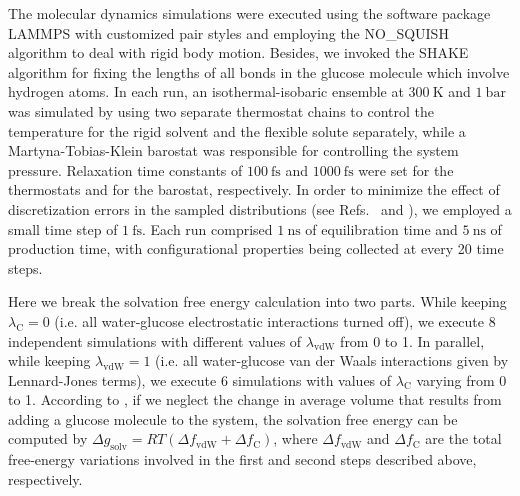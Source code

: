 \documentclass[journal=jctcce,manuscript=article,layout=twocolumn]{achemso}
\begin{document}
The molecular dynamics simulations were executed using the software package LAMMPS \cite{Plimpton_1995} with customized pair styles and employing the NO\_SQUISH algorithm \cite{Dullweber_1997, Miller_2002, Silveira_2017} to deal with rigid body motion. Besides, we invoked the SHAKE algorithm \cite{Ryckaert_1977} for fixing the lengths of all bonds in the glucose molecule which involve hydrogen atoms. In each run, an isothermal-isobaric ensemble at $300~\text{K}$ and $1~\text{bar}$ was simulated by using two separate thermostat chains to control the temperature for the rigid solvent\cite{Kamberaj_2005} and the flexible solute\cite{Martyna_1994} separately, while a Martyna-Tobias-Klein barostat\cite{Martyna_1994} was responsible for controlling the system pressure. Relaxation time constants of $100~\text{fs}$ and $1000~\text{fs}$ were set for the thermostats and for the barostat, respectively. In order to minimize the effect of discretization errors in the sampled distributions (see Refs.~ and ), we employed a small time step of $1~\text{fs}$. Each run comprised $1~\text{ns}$ of equilibration time and $5~\text{ns}$ of production time, with configurational properties being collected at every 20 time steps.

Here we break the solvation free energy calculation into two parts. While keeping $\lambda_\text{C} = 0$ (i.e. all water-glucose electrostatic interactions turned off), we execute 8 independent simulations with different values of $\lambda_\text{vdW}$ from 0 to 1. In parallel, while keeping $\lambda_\text{vdW} = 1$ (i.e. all water-glucose van der Waals interactions given by Lennard-Jones terms), we execute 6 simulations with values of $\lambda_\text{C}$ varying from 0 to 1. According to \citeauthor{Shirts_2003_2} \cite{Shirts_2003_2}, if we neglect the change in average volume that results from adding a glucose molecule to the system, the solvation free energy can be computed by ${\Delta g}_\text{solv} = RT (\Delta f_\text{vdW} + \Delta f_\text{C})$, where $\Delta f_\text{vdW}$ and $\Delta f_\text{C}$ are the total free-energy variations involved in the first and second steps described above, respectively.
\end{document}
